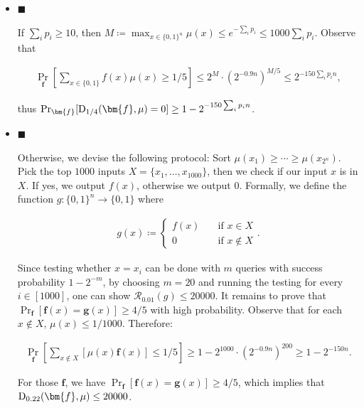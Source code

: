 \begin{itemize}


\item[] 
$\blacksquare$ 


If $\sum_{i}p_{i}\geq 10$, then $M\coloneqq\max_{x\in\{0,1\}^{n}}\mu(x)\leq e^{-\sum_{i}p_{i}}\leq 1000\sum_{i}p_{i}$. Observe that\par


\[\begin{gathered}
\Pr_{\bm{f}}\left[\sum\nolimits_{x\in\{0,1\}}f(x)\mu(x)\geq 1/5\right]\leq 2^{M}\cdot(2^{-0.9n})^{M/5}\leq 2^{-150\sum_{i}p_{i}n},
\end{gathered}\]


thus $\Pr_{\bm{f}}[{\textup{D}}_{1/4}(\bm{f},\mu)=0]\geq 1-2^{-150\sum_{i}p_{i}n}$.\par





\item[] 
$\blacksquare$ 


Otherwise, we devise the following protocol:
Sort $\mu(x_{1})\geq\cdots\geq\mu(x_{2^{n}})$.
Pick the top $1000$ inputs $X=\{x_{1},\ldots,x_{1000}\}$,
then we check if our input $x$ is in $X$.
If yes, we output $f(x)$, otherwise we output $0$.
Formally, we define the function $g:\{0,1\}^{n}\to\{0,1\}$ where\par


\[\begin{gathered}
g(x)\coloneqq\begin{cases}f(x)&\quad\text{if $x\in X$}\\
0&\quad\text{if $x\notin X$}\end{cases}.
\end{gathered}\]


Since testing whether $x=x_{i}$ can be done with $m$ queries with success probability $1-2^{-m}$, by choosing $m=20$ and running the testing for every $i\in[1000]$, one can show $\mathcal{R}_{0.01}(g)\leq 20000$. It remains to prove that $\Pr_{\bm{f}}[\bm{f}(x)=\bm{g}(x)]\geq 4/5$ with high probability. Observe that for each $x\notin X$, $\mu(x)\leq 1/1000$. Therefore:\par


\[\begin{gathered}
\Pr_{\bm{f}}\left[\sum\nolimits_{x\notin X}[\mu(x)\bm{f}(x)]\leq 1/5\right]\geq 1-2^{1000}\cdot(2^{-0.9n})^{200}\geq 1-2^{-150n}.
\end{gathered}\]


For those $\bm{f}$, we have $\Pr_{\bm{f}}[\bm{f}(x)=\bm{g}(x)]\geq 4/5$, which implies that ${\textup{D}}_{0.22}(\bm{f},\mu)\leq 20000$.\par





\end{itemize}


